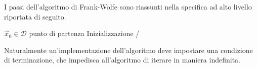 I passi dell'algoritmo di Frank-Wolfe sono riassunti nella specifica ad alto livello riportata di seguito.
\begin{tcolorbox}[
    enhanced,
    borderline south = {0.5mm}{0pt}{primary},
    frame hidden,
    colback=white, %
    colbacktitle=primary, %
    boxrule=0pt,   %
    sharp corners, %
    left=1pt,
    top=1pt,
    right=0pt,
    bottom=1pt,
    adjusted title = Algoritmo di Frank-Wolfe,
    halign title = center,
    fonttitle = \alt\fontseries{mid}\selectfont,
]
\begin{algorithm}[H]
    $ \vec{x}_0 \in \mathcal{D} $ punto di partenza \hfill {\alt {\ttfamily /*}  Inizializzazione {\ttfamily */}} \\[10pt]
\end{algorithm}
\end{tcolorbox}
\noindent
Naturalmente un'implementazione dell'algoritmo deve impostare una condizione di terminazione, che impedisca
all'algoritmo di iterare in maniera indefinita.
